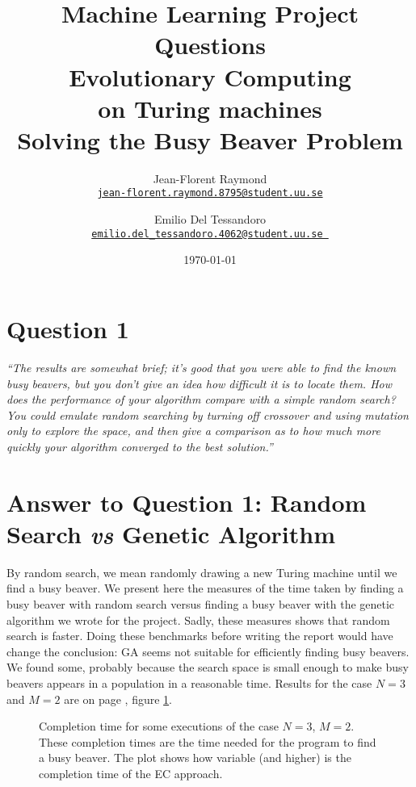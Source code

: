 \documentclass{report}
\title{Machine Learning Project Questions\\\textbf{Evolutionary Computing\\on Turing machines}\\{\Large Solving the Busy Beaver Problem}}
\author{Jean-Florent Raymond\\\href{mailto:jean-florent.raymond.8795@student.uu.se}{\texttt{jean-florent.raymond.8795@student.uu.se}} \and Emilio Del Tessandoro\\
  \href{mailto:emilio.del_tessandoro.4062@student.uu.se }{\texttt{emilio.del\_tessandoro.4062@student.uu.se }}}
\date{\today}
\begin{document}
\maketitle

\section*{Question 1}

\emph{``The results are somewhat brief; it's good that you were able to find
    the known busy beavers, but you don't give an idea how difficult it
    is to locate them. How does the performance of your algorithm
    compare with a simple random search? You could emulate random
    searching by turning off crossover and using mutation only to
    explore the space, and then give a comparison as to how much more
    quickly your algorithm converged to the best solution.''}

\section*{Answer to Question 1: Random Search \emph{vs} Genetic Algorithm}

By random search, we mean randomly drawing a new Turing machine until we find a busy beaver.
We present here the measures of the time taken by finding a busy beaver with random search versus finding a busy beaver with the genetic algorithm we wrote for the project. Sadly, these measures shows that random search is faster. Doing these benchmarks before writing the report would have change the conclusion: GA seems not suitable for efficiently finding busy beavers. We found some, probably because the search space is small enough to make busy beavers appears in a population in a reasonable time. Results for the case $N = 3$ and $M = 2$ are on page \pageref{plot:rnd}, figure \ref{plot:rnd}.

\begin{figure}[t]
\centering
{}
\caption[]{Completion time for some executions of the case $N=3$, $M=2$. These completion times are the time needed for the program to find a busy beaver. The plot shows how variable (and higher) is the completion time of the EC approach.}
\label{plot:rnd}
\end{figure}
\end{document}
